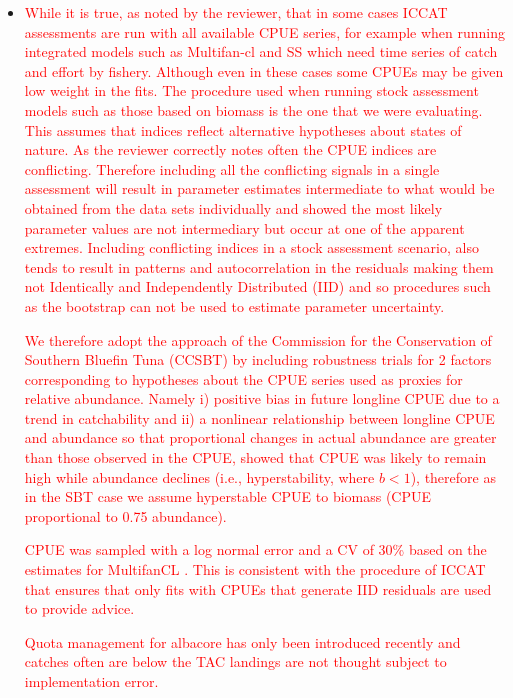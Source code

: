 \documentclass[a4paper,10pt]{article}
\newcommand{\red}{\textcolor{red}}
\begin{document}
\begin{enumerate}
 \begin{itemize}
    \item \red{While it is true, as noted by the reviewer, that in some cases ICCAT assessments are run with all available CPUE series, for example when running integrated models such as Multifan-cl and SS which need time series of catch and effort by fishery. Although even in these cases some CPUEs may be given low weight in the fits. The procedure used when running stock assessment models such as those based on biomass is the one that we were evaluating. This assumes that indices reflect alternative hypotheses about states of nature. As the reviewer correctly notes often the CPUE indices are conflicting. Therefore including all the conflicting signals in a single assessment will result in parameter estimates intermediate to what would be obtained from the data sets individually and \cite{schnute1993analysis} showed the most likely parameter values are not intermediary but occur at one of the apparent extremes.  
    Including conflicting indices in a stock assessment scenario, also tends to result in patterns and autocorrelation in the residuals making them not Identically and Independently Distributed (IID) and so procedures such as the bootstrap can not be used to estimate parameter uncertainty.}
    
    \red{We therefore adopt the approach of the Commission for the Conservation of Southern Bluefin Tuna (CCSBT) by including robustness trials \citep[see][]{hillary2015scientific} for 2 factors corresponding to hypotheses about the CPUE series used as proxies for relative abundance. Namely i) positive bias in future longline CPUE due to a trend in catchability and ii) a nonlinear relationship between longline CPUE and abundance so that proportional changes in actual abundance are greater than those observed in the CPUE, \citep{harley2001cpue} showed that CPUE was likely to remain high while abundance declines (i.e., hyperstability, where $b < 1$), therefore as in the SBT case we assume hyperstable CPUE to biomass (CPUE proportional to 0.75  abundance).}
    
    \red{CPUE was sampled with a log normal error and a CV of 30\% based on the estimates for MultifanCL \citep{anon}. This is consistent with the procedure of ICCAT that ensures that only fits with CPUEs that generate IID residuals are used to provide advice.}
    
    \red{Quota management for albacore has only been introduced recently and catches often are below the TAC landings are not thought subject to implementation error.}
    
  \end{itemize}

\end{enumerate}
\end{document}
